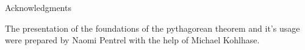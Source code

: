 \begin{omgroup}[id=PythagoreanTheorem-ack]{Acknowledgments}
  \begin{omtext}[title=Materials]
    The presentation of the foundations of the pythagorean theorem and it's usage were prepared by Naomi Pentrel with the help of Michael Kohlhase.
  \end{omtext}



\end{omgroup}

